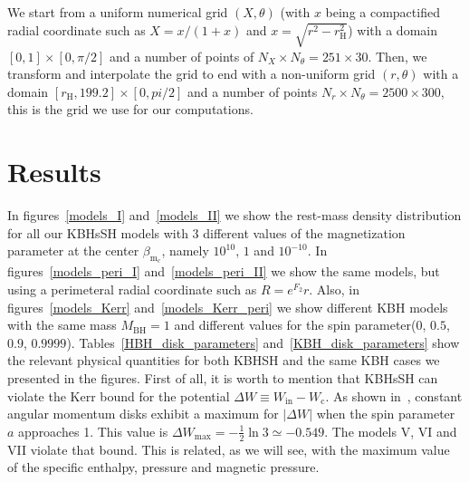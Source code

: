 \documentclass[twocolumn,aps,showpacs,showkeys,prd,superscriptaddress,byrevtex, amsmath]{revtex4-1}
\begin{document}
We start from a uniform numerical grid $(X, \theta)$ (with $x$ being a compactified radial coordinate such as $X = x/(1+x)$ and $x = \sqrt{r^2 - r_{\mathrm{H}}^2}$) with a domain $[0, 1] \times [0, \pi/2]$ and a number of points of $N_X \times N_\theta = 251 \times 30$. Then, we transform and interpolate the grid to end with a non-uniform grid $(r, \theta)$ with a domain $[r_{\mathrm{H}}, 199.2] \times [0, pi/2]$ and a number of points $N_r \times N_\theta = 2500 \times 300$, this is the grid we use for our computations.

\section{Results}
\label{results}


In figures~\ref{models_I} and~\ref{models_II} we show the rest-mass density distribution for all our KBHsSH models with 3 different values of the magnetization parameter at the center $\beta_{\mathrm{m_c}}$, namely $10^{10}$, $1$ and $10^{-10}$. In figures~\ref{models_peri_I} and~\ref{models_peri_II} we show the same models, but using a perimeteral radial coordinate such as $R = e^{F_2} r$. Also, in figures~\ref{models_Kerr} and~\ref{models_Kerr_peri} we show different KBH models with the same mass $M_{\mathrm{BH}} = 1$ and different values for the spin parameter($0$, $0.5$, $0.9$, $0.9999$). Tables~\ref{HBH_disk_parameters} and~\ref{KBH_disk_parameters} show the relevant physical quantities for both KBHSH and the same KBH cases we presented in the figures. First of all, it is worth to mention that KBHsSH can violate the Kerr bound for the potential $\Delta W \equiv W_{\mathrm{in}} - W_{\mathrm{c}}$. As shown in~\cite{Abramowicz:1978}, constant angular momentum disks exhibit a maximum for $|\Delta W|$ when the spin parameter $a$ approaches 1. This value is $\Delta W_{\mathrm{max}} = -\frac{1}{2} \ln 3 \simeq -0.549$. The models V, VI and VII violate that bound. This is related, as we will see, with the maximum value of the specific enthalpy, pressure and magnetic pressure.
\end{document}
